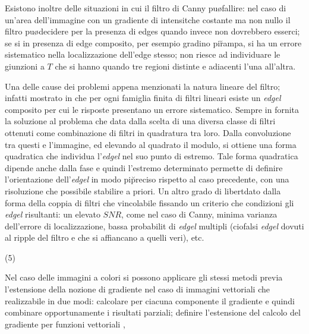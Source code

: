 Esistono inoltre delle situazioni in cui il filtro di Canny pu\o fallire:
\bi
\im nel caso di un'area dell'immagine con un gradiente di intensit\a che \e costante
    ma non nullo il filtro pu\o decidere per la presenza di edges quando invece non
    dovrebbero esserci;
\im se si \e in presenza di edge composito, per esempio gradino pi\u rampa,
    si ha un errore sistematico nella localizzazione dell'edge stesso;
\im non riesce ad individuare le giunzioni a $T$ che si hanno quando tre regioni 
    distinte e adiacenti l'una all'altra.
\ei
 
Una delle cause dei problemi appena menzionati \e la natura lineare del filtro; infatti
\e mostrato in \cite{Perona90} che per ogni famiglia finita di filtri lineari esiste
un {\it edgel} composito per cui le risposte presentano un errore sistematico.
Sempre in \cite{Perona90} \e fornita la soluzione al problema che \e data dalla
scelta di una diversa classe di filtri ottenuti come combinazione di filtri
in quadratura tra loro.
Dalla convoluzione tra questi e l'immagine, ed elevando al quadrato il modulo, si ottiene
una forma quadratica che individua l'{\it edgel} nel suo punto di estremo.
Tale forma quadratica dipende anche dalla fase e quindi l'estremo determinato permette
di definire l'orientazione dell'{\it edgel} in modo pi\u preciso rispetto al caso precedente,
con una risoluzione che \e possibile stabilire a priori.
Un altro grado di libert\a \e dato dalla forma della coppia di filtri che \e vincolabile
fissando un criterio che condizioni gli {\it edgel} risultanti: un elevato $SNR$, come
nel caso di Canny, minima varianza dell'errore di localizzazione, bassa probabilit\a
di {\it edgel} multipli (cio\e falsi {\it edgel} dovuti al ripple del filtro e che si affiancano
a quelli veri), etc.

\vs(5)

Nel caso delle immagini a colori si possono applicare gli stessi metodi previa l'estensione
della nozione di gradiente nel caso di immagini vettoriali che \e realizzabile in due
modi:
\ben
\im calcolare per ciacuna componente il gradiente e quindi combinare opportunamente
    i risultati parziali;
\im definire l'estensione del calcolo del gradiente per funzioni vettoriali
    \cite{Gevers}, \cite{Lucchese}


